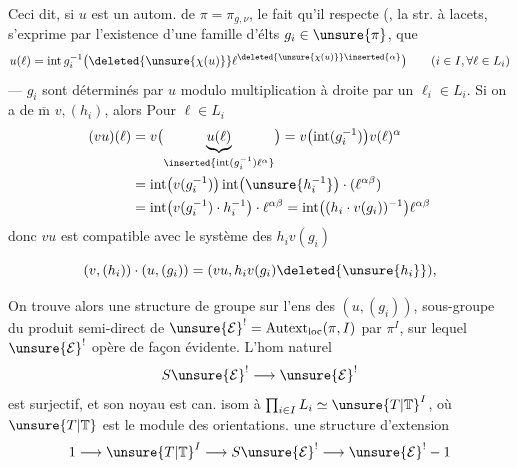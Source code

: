 Ceci dit, si $u$ est un autom. de $\pi=\pi_{g,\nu}$, le fait qu'il respecte (,  la str. à lacets, s'exprime par l'existence d'une famille d'élts $g_i\in\unsure{\pi}$,  que
\[
u(\ell)=\operatorname{int}g_i^{-1}\bigl(\deleted{\unsure{\chi(u)}}\ell^{\deleted{\unsure{\chi(u)}}\inserted{\alpha}}\bigr)
\qquad(i\in I,\forall\ell\in L_i)
\]
---  $g_i$ sont déterminés par $u$  modulo multiplication à droite par un $\ell_i\in L_i$. Si on a de $\overline{\mathrm m}$ $v,(h_i)$, alors  Pour $\ell\in L_i$ 
\[
\begin{aligned}
(vu)(\ell)
&=v\bigl(\underbrace{u(\ell)}_{\inserted{\operatorname{int}(g_i^{-1})\ell^{\alpha}}}\bigr)
=v\bigl(\operatorname{int}(g_i^{-1})\bigr)v(\ell)^{\alpha}\\
&=\operatorname{int}\bigl(v(g_i^{-1})\bigr)\operatorname{int}\bigl(\unsure{h_i^{-1}}\bigr)\cdot(\ell^{\alpha\beta})\\
&=\operatorname{int}\bigl(v(g_i^{-1})\cdot h_i^{-1}\bigr)\cdot\ell^{\alpha\beta}
=\operatorname{int}\bigl((h_i\cdot v(g_i))^{-1}\bigr)\ell^{\alpha\beta}
\end{aligned}
\]
donc $vu$ est compatible avec le système des  $h_i v(g_i)$ 


\[
(v,(h_i))\cdot(u,(g_i))=(vu,h_i v(g_i)\deleted{\unsure{h_i}}),
\]

On trouve alors une structure de groupe sur l'ens  des $(u,(g_i))$, sous-groupe du produit semi-direct de $\unsure{\mathcal E}^{!}=\mathrm{Autext}_{\mathrm{loc}}(\pi,I)$  par $\pi^I$, sur lequel $\unsure{\mathcal E}^{!}$ opère de façon évidente. L'hom naturel
\[
S\unsure{\mathcal E}^{!}\longrightarrow\unsure{\mathcal E}^{!}
\]
est surjectif, et son noyau est can. isom à $\prod_{i\in I} L_i\simeq \unsure{T|\mathbb T}^I$, où $\unsure{T|\mathbb T}$ est le module des orientations.
 une structure d'extension 
\[
1\longrightarrow \unsure{T|\mathbb T}^I\longrightarrow S\unsure{\mathcal E}^{!}\longrightarrow\unsure{\mathcal E}^{!}-1
\]

